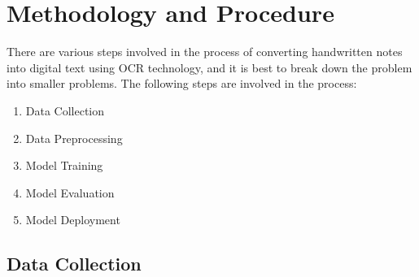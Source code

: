 \documentclass[twoside,a4paper]{article}
\begin{document}
\section{Methodology and Procedure}
There are various steps involved in the process of converting handwritten notes into digital text using OCR technology, and it is best to break down the problem into smaller problems.
The following steps are involved in the process:
\begin{enumerate}
    \item Data Collection
    \item Data Preprocessing
    \item Model Training
    \item Model Evaluation
    \item Model Deployment
\end{enumerate}

\subsection{Data Collection}


\end{document}
